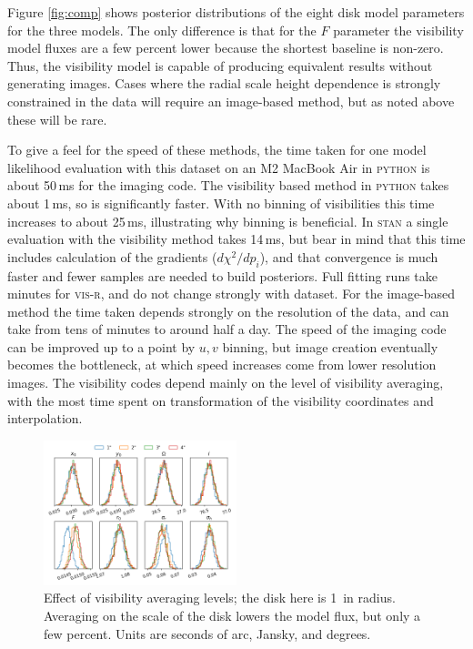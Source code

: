 \documentclass[fleqn,usenatbib]{mnras}
\begin{document}
Figure \ref{fig:comp} shows posterior distributions of the eight disk model parameters for the three models. The only difference is that for the $F$ parameter the visibility model fluxes are a few percent lower because the shortest baseline is non-zero. Thus, the visibility model is capable of producing equivalent results without generating images. Cases where the radial scale height dependence is strongly constrained in the data will require an image-based method, but as noted above these will be rare.

To give a feel for the speed of these methods, the time taken for one model likelihood evaluation with this dataset on an M2 MacBook Air in \textsc{python} is about 50\,ms for the imaging code. The visibility based method in \textsc{python} takes about 1\,ms, so is significantly faster. With no binning of visibilities this time increases to about 25\,ms, illustrating why binning is beneficial. In \textsc{stan} a single evaluation with the visibility method takes 14\,ms, but bear in mind that this time includes calculation of the gradients ($d \chi^2 / dp_i$), and that convergence is much faster and fewer samples are needed to build posteriors. Full fitting runs take minutes for \textsc{vis-r}, and do not change strongly with dataset. For the image-based method the time taken depends strongly on the resolution of the data, and can take from tens of minutes to around half a day. The speed of the imaging code can be improved up to a point by $u,v$ binning, but image creation eventually becomes the bottleneck, at which speed increases come from lower resolution images. The visibility codes depend mainly on the level of visibility averaging, with the most time spent on transformation of the visibility coordinates and interpolation.

\begin{figure}
    \centering
    \includegraphics[width=0.5\textwidth]{avg.png}
    \caption{Effect of visibility averaging levels; the disk here is 1\arcsec~in radius. Averaging on the scale of the disk lowers the model flux, but only a few percent. Units are seconds of arc, Jansky, and degrees.}
    \label{fig:avg}
\end{figure}
\end{document}
